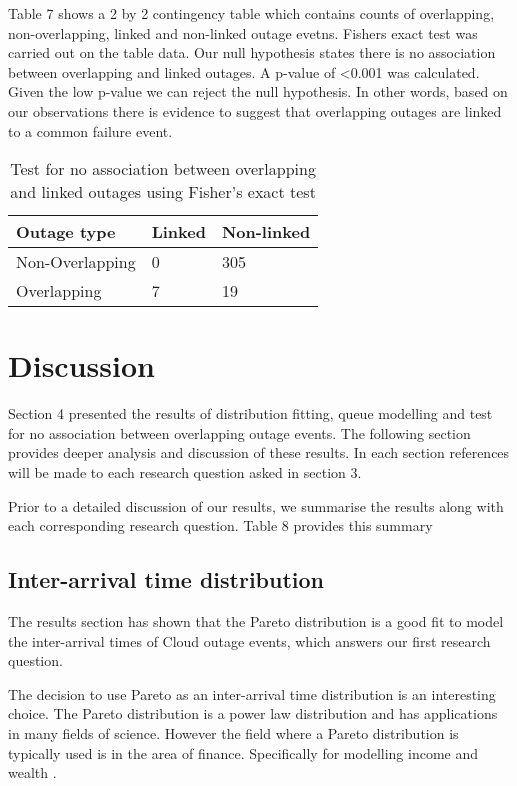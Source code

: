 \documentclass[5p]{elsarticle}
\begin{document}
Table 7 shows a 2 by 2 contingency table which contains counts of overlapping, non-overlapping, linked and non-linked outage evetns. Fishers exact test was carried out on the table data. Our null hypothesis states there is no association between overlapping and linked outages. A p-value of \textless 0.001 was calculated. Given the low p-value we can reject the null hypothesis. In other words, based on our observations there is evidence to suggest that overlapping outages are linked to a common failure event.

\begin {table}
\caption {Test for no association between overlapping and linked outages using Fisher's exact test} 
\begin{center}
\begin{tabular}{p{2.7cm} |  p{1.1cm} | p{2cm}} \hline \bf{Outage type} & \bf{Linked}  & \bf{Non-linked}
\\ \hline Non-Overlapping  & 0 & 305
\\ Overlapping & 7 & 19
\\ \hline
\end{tabular}
\end{center}
\end{table}

\section{Discussion}

Section 4 presented the results of distribution fitting, queue modelling and test for no association between overlapping outage events. The following section provides deeper analysis and discussion of these results. In each section references will be made to each research question asked in section 3. 

Prior to a detailed discussion of our results, we summarise the results along with each corresponding research question. Table 8 provides this summary

\subsection{Inter-arrival time distribution}

The results section has shown that the Pareto distribution is a good fit to model the inter-arrival times of Cloud outage events, which answers our first research question.

The decision to use Pareto as an inter-arrival time distribution is an interesting choice. The Pareto distribution is a power law distribution and has applications in many fields of science. However the field where a Pareto distribution is typically used is in the area of finance. Specifically for modelling income and wealth \cite{arnold2015pareto}. 
\end{document}
